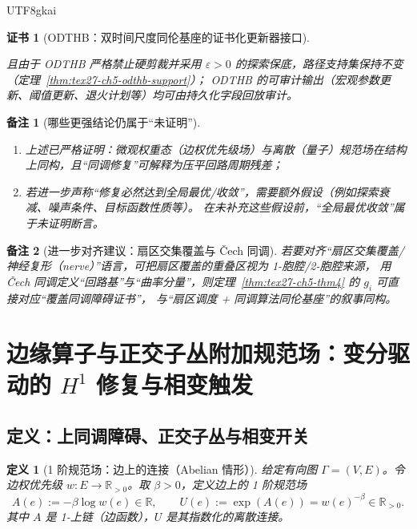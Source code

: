 \documentclass[12pt]{article}
\newtheorem{definition}{定义}[section]
\newtheorem{remark}{备注}[section]
\newtheorem{Certificate}{证书}[section]
\newcommand{\RR}{\mathbb{R}}
\newcommand{\ORLDTHBase}{\textsf{ODTHB}}
\begin{document}
\begin{CJK*}{UTF8}{gkai}
\begin{Certificate}[\ORLDTHBase：双时间尺度同伦基座的证书化更新器接口]
\begin{description}
  且由于 ODTHB 严格禁止硬剪裁并采用 $\varepsilon>0$ 的探索保底，路径支持集保持不变（定理~\ref{thm:tex27-ch5-odthb-support}）；
  ODTHB 的可审计输出（宏观参数更新、阈值更新、退火计划等）均可由持久化字段回放审计。
\end{description}
\end{Certificate}

\begin{remark}[哪些更强结论仍属于“未证明”]
\begin{enumerate}
  \item 上述已严格证明：微观权重态（边权优先级场）与离散（量子）规范场在结构上同构，且“同调修复”可解释为压平回路周期残差；
  \item 若进一步声称“修复必然达到全局最优/收敛”，需要额外假设（例如探索衰减、噪声条件、目标函数性质等）。
  在未补充这些假设前，“全局最优收敛”属于未证明断言。
\end{enumerate}
\end{remark}

\begin{remark}[进一步对齐建议：扇区交集覆盖与 Čech 同调]
若要对齐“扇区交集覆盖/神经复形（nerve）”语言，可把扇区覆盖的重叠区视为 1-胞腔/2-胞腔来源，
用 Čech 同调定义“回路基”与“曲率分量”，则定理~\ref{thm:tex27-ch5-thm4} 的 $g_i$ 可直接对应“覆盖同调障碍证书”，
与“扇区调度 + 同调算法同伦基座”的叙事同构。
\cite{HatcherAT}
\end{remark}

\clearpage

\section{边缘算子与正交子丛附加规范场：变分驱动的 \texorpdfstring{$H^1$}{H1} 修复与相变触发}
\label{sec:tex27-ch6-edge-operator}

\subsection{定义：上同调障碍、正交子丛与相变开关}
\label{subsec:tex27-ch6-defs}

\begin{definition}[1 阶规范场：边上的连接（Abelian 情形）]
\label{def:tex27-ch6-d1}
给定有向图 $\Gamma=(V,E)$。令边权优先级 $w:E\to\RR_{>0}$。取 $\beta>0$，定义边上的 1 阶规范场
\[
  A(e):=-\beta\log w(e)\in\RR,\qquad U(e):=\exp(A(e))=w(e)^{-\beta}\in\RR_{>0}.
\]
其中 $A$ 是 1-上链（边函数），$U$ 是其指数化的离散连接。
\end{definition}


\end{CJK*}
\end{document}
